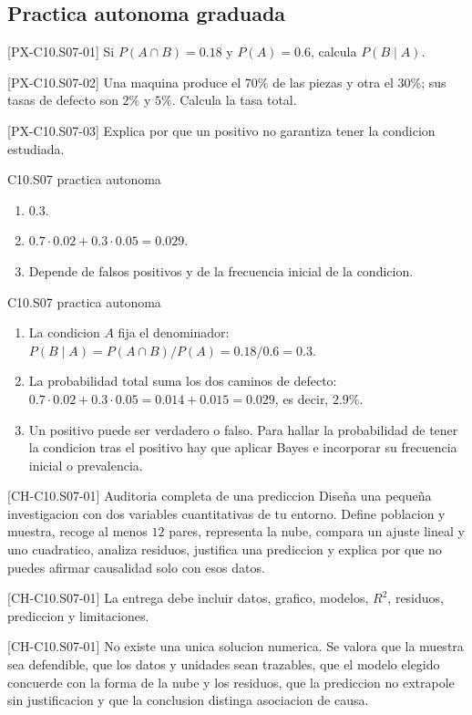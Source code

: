 \subsection*{Practica autonoma graduada}
\begin{exercise}{[PX-C10.S07-01] Si \(P(A\cap B)=0.18\) y \(P(A)=0.6\), calcula \(P(B\mid A)\).}\end{exercise}
\begin{exercise}{[PX-C10.S07-02] Una maquina produce el \(70\%\) de las piezas y otra el \(30\%\); sus tasas de defecto son \(2\%\) y \(5\%\). Calcula la tasa total.}\end{exercise}
\begin{exercise}{[PX-C10.S07-03] Explica por que un positivo no garantiza tener la condicion estudiada.}\end{exercise}
\begin{shortanswer}{C10.S07 practica autonoma}
\begin{enumerate}
  \item \(0.3\).
  \item \(0.7\cdot0.02+0.3\cdot0.05=0.029\).
  \item Depende de falsos positivos y de la frecuencia inicial de la condicion.
\end{enumerate}
\end{shortanswer}
\begin{fullsolution}{C10.S07 practica autonoma}
\begin{enumerate}
  \item La condicion \(A\) fija el denominador:
  \(P(B\mid A)=P(A\cap B)/P(A)=0.18/0.6=0.3\).
  \item La probabilidad total suma los dos caminos de defecto:
  \(0.7\cdot0.02+0.3\cdot0.05=0.014+0.015=0.029\), es decir, \(2.9\%\).
  \item Un positivo puede ser verdadero o falso. Para hallar la probabilidad de tener la
  condicion tras el positivo hay que aplicar Bayes e incorporar su frecuencia inicial o
  prevalencia.
\end{enumerate}
\end{fullsolution}

\begin{challenge}{[CH-C10.S07-01] Auditoria completa de una prediccion}
Diseña una pequeña investigacion con dos variables cuantitativas de tu entorno. Define poblacion y
muestra, recoge al menos \(12\) pares, representa la nube, compara un ajuste lineal y uno
cuadratico, analiza residuos, justifica una prediccion y explica por que no puedes afirmar
causalidad solo con esos datos.
\end{challenge}
\begin{shortanswer}{[CH-C10.S07-01]}
La entrega debe incluir datos, grafico, modelos, \(R^2\), residuos, prediccion y limitaciones.
\end{shortanswer}
\begin{fullsolution}{[CH-C10.S07-01]}
No existe una unica solucion numerica. Se valora que la muestra sea defendible, que los datos y
unidades sean trazables, que el modelo elegido concuerde con la forma de la nube y los residuos,
que la prediccion no extrapole sin justificacion y que la conclusion distinga asociacion de causa.
\end{fullsolution}
